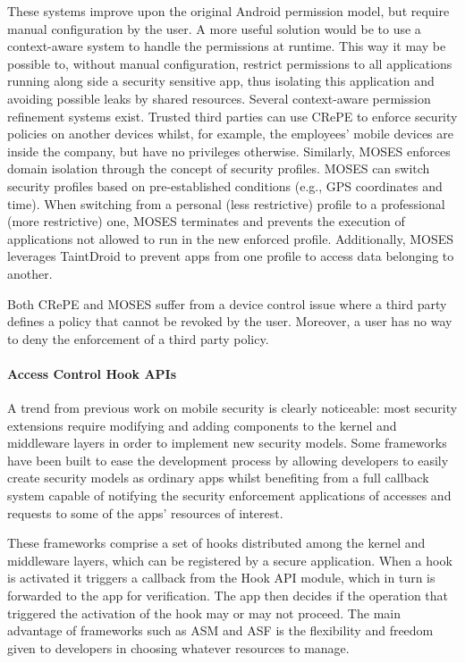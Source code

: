 These systems improve upon the original Android permission model, but require manual configuration by the user. A more useful solution would be to use a context-aware system to handle the permissions at runtime. This way it may be possible to, without manual configuration, restrict permissions to all applications running along side a security sensitive app, thus isolating this application and avoiding possible leaks by shared resources. Several context-aware permission refinement systems exist. Trusted third parties can use CRePE \cite{conti2011crepe} to enforce security policies on another devices whilst, for example, the employees' mobile devices are inside the company, but have no privileges otherwise. Similarly, MOSES \cite{russello2012moses} enforces domain isolation through the concept of security profiles. MOSES can switch security profiles based on pre-established conditions (e.g., GPS coordinates and time). When switching from a personal (less restrictive) profile to a professional (more restrictive) one, MOSES terminates and prevents the execution of applications not allowed to run in the new enforced profile. Additionally, MOSES leverages TaintDroid \cite{enck2014taintdroid} to prevent apps from one profile to access data belonging to another.

Both CRePE and MOSES suffer from a device control issue where a third party defines a policy that cannot be revoked by the user. Moreover, a user has no way to deny the enforcement of a third party policy. 

\paragraph{\textbf{Access Control Hook APIs}}

A trend from previous work on mobile security is clearly noticeable: most security extensions require modifying and adding components to the kernel and middleware layers in order to implement new security models. Some frameworks have been built to ease the development process by allowing developers to easily create security models as ordinary apps whilst benefiting from a full callback system capable of notifying the security enforcement applications of accesses and requests to some of the apps' resources of interest.

These frameworks comprise a set of hooks distributed among the kernel and middleware layers, which can be registered by a secure application. When a hook is activated it triggers a callback from the Hook API module, which in turn is forwarded to the app for verification. The app then decides if the operation that triggered the activation of the hook may or may not proceed. The main advantage of frameworks such as \ac{ASM} \cite{heuser2014asm} and \ac{ASF} \cite{backes2014android} is the flexibility and freedom given to developers in choosing whatever resources to manage.


